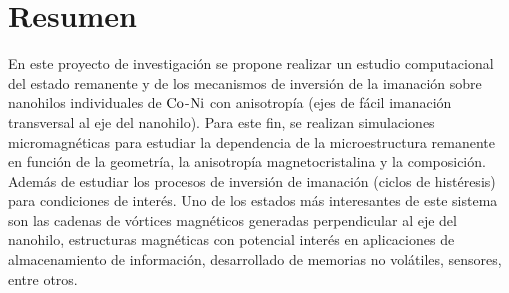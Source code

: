 \newpage
\thispagestyle{empty}
\section*{Resumen}
En este proyecto de investigación se propone realizar un estudio computacional del estado remanente y de los mecanismos de inversión de la imanación sobre nanohilos individuales de $\ce{Co}$-$\ce{Ni}$ con anisotropía (ejes de fácil imanación transversal al eje del nanohilo). Para este fin, se realizan simulaciones micromagnéticas para estudiar la dependencia de la microestructura remanente en función de la geometría, la anisotropía magnetocristalina y la composición. Además de estudiar los procesos de inversión de imanación (ciclos de histéresis) para condiciones de interés. Uno de los estados más interesantes de este sistema son las cadenas de vórtices magnéticos generadas perpendicular al eje del nanohilo, estructuras magnéticas con potencial interés en aplicaciones de almacenamiento de información, desarrollado de memorias no volátiles, sensores, entre otros.
